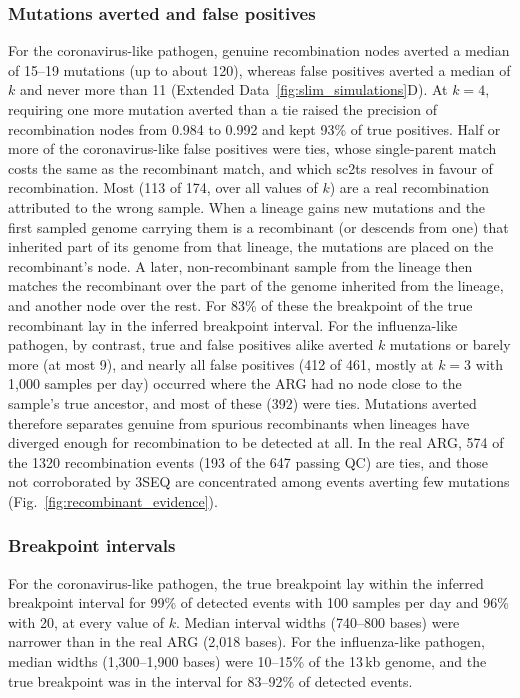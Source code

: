 \documentclass[12pt]{article}
\newcommand{\figref}[1]{Fig.~\ref{#1}}
\newcommand{\edref}[1]{Extended Data~\ref{#1}}
\begin{document}
\subsubsection{Mutations averted and false positives}
For the coronavirus-like pathogen, genuine recombination nodes
averted a median of 15--19 mutations (up to about 120),
whereas false positives averted a median of $k$ and never more than 11
(\edref{fig:slim_simulations}D).
At $k=4$, requiring one more mutation averted than a tie
raised the precision of recombination nodes from 0.984 to 0.992
and kept 93\% of true positives.
Half or more of the coronavirus-like false positives were ties,
whose single-parent match costs the same as the recombinant match,
and which sc2ts resolves in favour of recombination.
Most (113 of 174, over all values of $k$) are a real recombination
attributed to the wrong sample.
When a lineage gains new mutations and the first sampled genome carrying them
is a recombinant (or descends from one) that inherited part of its genome from that lineage,
the mutations are placed on the recombinant's node.
A later, non-recombinant sample from the lineage then matches the recombinant
over the part of the genome inherited from the lineage, and another node over the rest.
For 83\% of these the breakpoint of the true recombinant lay in the inferred breakpoint interval.
For the influenza-like pathogen, by contrast,
true and false positives alike averted $k$ mutations or barely more (at most 9),
and nearly all false positives (412 of 461, mostly at $k=3$ with 1,000 samples per day)
occurred where the ARG had no node close to the sample's true ancestor,
and most of these (392) were ties.
Mutations averted therefore separates genuine from spurious recombinants
when lineages have diverged enough for recombination to be detected at all.
In the real ARG, 574 of the 1320 recombination events
(193 of the 647 passing QC) are ties,
and those not corroborated by 3SEQ are concentrated among events
averting few mutations (\figref{fig:recombinant_evidence}).

\subsubsection{Breakpoint intervals}
For the coronavirus-like pathogen, the true breakpoint lay within
the inferred breakpoint interval for 99\% of detected events
with 100 samples per day and 96\% with 20, at every value of $k$.
Median interval widths (740--800 bases) were narrower than
in the real ARG (2,018 bases).
For the influenza-like pathogen, median widths (1,300--1,900 bases)
were 10--15\% of the 13\,kb genome,
and the true breakpoint was in the interval for 83--92\% of detected events.
\end{document}
